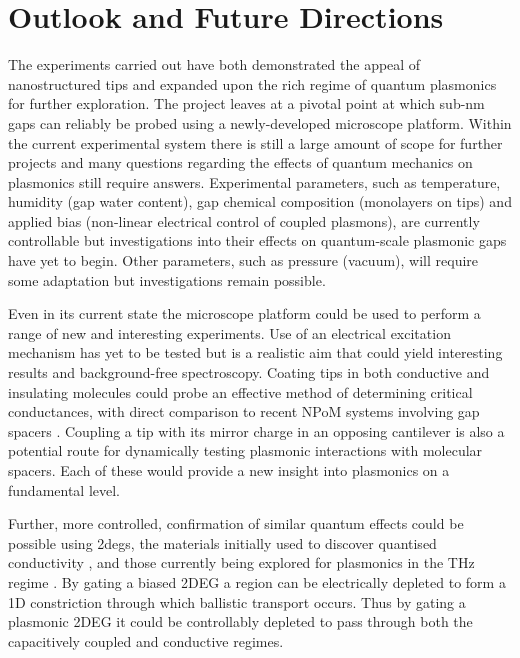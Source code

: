 \documentclass[12pt, a4paper, oneside]{book}
\begin{document}
\section{Outlook and Future Directions}

The experiments carried out have both demonstrated the appeal of nanostructured tips and expanded upon the rich regime of quantum plasmonics for further exploration. The project leaves at a pivotal point at which sub-nm gaps can reliably be probed using a newly-developed microscope platform. Within the current experimental system there is still a large amount of scope for further projects and many questions regarding the effects of quantum mechanics on plasmonics still require answers. Experimental parameters, such as temperature, humidity (gap water content), gap chemical composition (monolayers on tips) and applied bias (non-linear electrical control of coupled plasmons), are currently controllable but investigations into their effects on quantum-scale plasmonic gaps have yet to begin. Other parameters, such as pressure (vacuum), will require some adaptation but investigations remain possible.

Even in its current state the microscope platform could be used to perform a range of new and interesting experiments. Use of an electrical excitation mechanism has yet to be tested but is a realistic aim that could yield interesting results and background-free spectroscopy. Coating tips in both conductive and insulating molecules could probe an effective method of determining critical conductances, with direct comparison to recent NPoM systems involving gap spacers \cite{mertens2013, benz2014, cha2014, denijs2014}. Coupling a tip with its mirror charge in an opposing cantilever is also a potential route for dynamically testing plasmonic interactions with molecular spacers. Each of these would provide a new insight into plasmonics on a fundamental level.

Further, more controlled, confirmation of similar quantum effects could be possible using \glspl{2deg}, the materials initially used to discover quantised conductivity \cite{van1988quantized, wharam1988one}, and those currently being explored for plasmonics in the THz regime \cite{koppens2011graphene, christensen2011graphene, chen2012optical}. By gating a biased 2DEG a region can be electrically depleted to form a 1D constriction through which ballistic transport occurs. Thus by gating a plasmonic 2DEG it could be controllably depleted to pass through both the capacitively coupled and conductive regimes.
\end{document}
